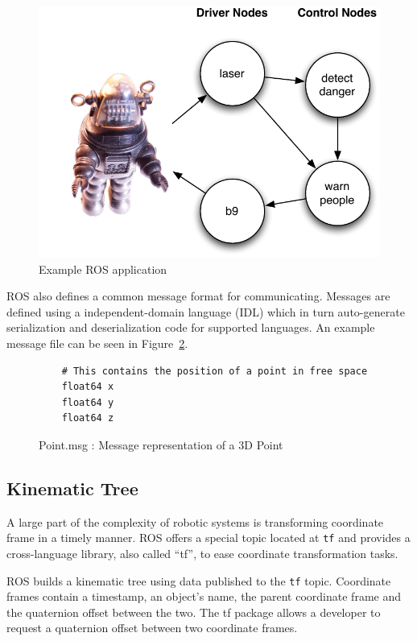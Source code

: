 \begin{figure}[ht]
\includegraphics{images/middleware-ros.pdf}
\caption{Example ROS application\label{fig:middleware-ros}}
\end{figure}

ROS also defines a common message format for communicating. Messages are defined using a independent-domain language (IDL) which in turn auto-generate serialization and deserialization code for supported languages. An example message file can be seen in Figure~\ref{fig:point}.

\begin{figure}[ht]
\makebox[\textwidth]{\hrulefill}
\begin{verbatim}
	# This contains the position of a point in free space
	float64 x
	float64 y
	float64 z
\end{verbatim}
\makebox[\textwidth]{\hrulefill}
\caption{Point.msg : Message representation of a 3D Point\label{fig:point}}
\end{figure}

\subsection{Kinematic Tree}
A large part of the complexity of robotic systems is transforming coordinate frame in a timely manner. ROS offers a special topic located at \verb!tf! and provides a cross-language library, also called ``tf'', to ease coordinate transformation tasks.

ROS builds a kinematic tree using data published to the \verb!tf! topic. Coordinate frames contain a timestamp, an object's name, the parent coordinate frame and the quaternion offset between the two. The tf package allows a developer to request a quaternion offset between two coordinate frames. 

